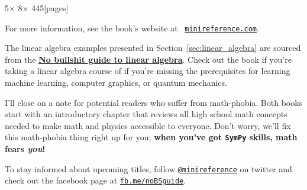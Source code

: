 \documentclass[9pt, onecolumn]{IEEEtran}
\begin{document}
\noindent
  \hfill {\small   5\textonehalf[in] $\times$ 8\textonehalf[in] $\times$ 445[pages] } 






%

%

\noindent
For more information, see the book's website %
at \,  \href{http://minireference.com/}{\texttt{minireference.com}}.

The linear algebra examples presented in Section~\ref{sec:linear_algebra} are 
sourced from the \href{https://gum.co/noBSLA}{\textbf{No bullshit guide to linear algebra}}.
Check out the book if you're taking a linear algebra course of if you're missing the prerequisites 
for learning machine learning, computer graphics, or quantum mechanics.

I'll close on a note for potential readers who suffer from math-phobia.
Both books start with an introductory chapter that reviews all 
high school math concepts needed to make math and physics 
accessible to everyone.
Don't worry, we'll fix this math-phobia thing right up for you;
\textbf{when you've got \texttt{SymPy} skills, math fears \emph{you}!}

To stay informed about upcoming titles,
follow \href{https://twitter.com/minireference}{\texttt{@minireference}} on twitter 
and check out the facebook page at \href{http://fb.me/noBSguide}{\texttt{fb.me/noBSguide}}.
\end{document}
